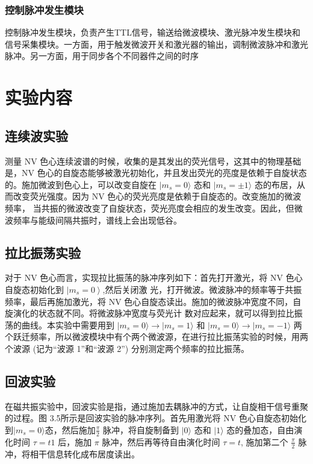 \documentclass[a4paper,UTF8]{ctexart}
\begin{document}
\subsubsection{控制脉冲发生模块}

控制脉冲发生模块，负责产生TTL信号，输送给微波模块、激光脉冲发生模块和信号采集模块。一方面，用于触发微波开关和激光器的输出，调制微波脉冲和激光脉冲。另一方面，用于同步各个不同器件之间的时序

\section{实验内容}

\subsection{连续波实验}

测量 NV 色心连续波谱的时候，收集的是其发出的荧光信号，这其中的物理基础是，NV 色心的自旋态能够被激光初始化，并且发出荧光的亮度是依赖于自旋状态
 的。施加微波到色心上，可以改变自旋在 $|m_s=0\rangle$ 态和 $|m_s=\pm1\rangle$ 态的布居，从而改变荧光强度。因为 NV 色心的荧光亮度是依赖于自旋态的。改变施加的微波频率， 当共振的微波改变了自旋状态，荧光亮度会相应的发生改变。因此，但微波频率与能级间隔共振时，谱线上会出现低谷。


\subsection{拉比振荡实验}

对于 NV 色心而言，实现拉比振荡的脉冲序列如下：首先打开激光，将 NV 色心自旋态初始化到 $\left|m_s=0\right>$,然后关闭激
光，打开微波。微波脉冲的频率等于共振频率，最后再施加激光，将 NV 色心自旋态读出。施加的微波脉冲宽度不同，自旋演化的状态就不同。将微波脉冲宽度与荧光计
 数对应起来，就可以得到拉比振荡的曲线。本实验中需要用到 $|m_s=0\rangle\to|m_s=1\rangle$ 和 $|m_s=0\rangle\to|m_s=-1\rangle$ 两个跃迁频率，所以微波模块中有个两个微波源，在进行拉比振荡实验的时候，用两个波源 (记为“波源 1”和“波源 2”) 分别测定两个频率的拉比振荡。


\subsection{回波实验}

在磁共振实验中，回波实验是指，通过施加去耦脉冲的方式，让自旋相干信号重聚的过程。图 3.5所示是回波实验的脉冲序列。首先用激光将 NV 色心自旋态初始化到$|m_s=0\rangle$态，然后施加$\frac\pi2$ 脉冲，将自旋制备到 $|0\rangle$ 态和 $|1\rangle$ 态的叠加态，自由演化时间 $\tau=t1$ 后，施加 $\pi$ 脉冲，然后再等待自由演化时间 $\tau=t$, 施加第二个 $\frac\pi2$ 脉冲，将相干信息转化成布居度读出。
\end{document}
